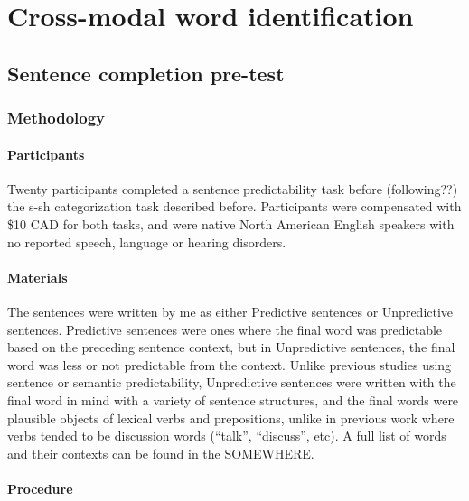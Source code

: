 
\chapter{Cross-modal word identification}

\section{Sentence completion pre-test}

\subsection{Methodology}

\subsubsection{Participants}

Twenty participants completed a sentence predictability task before (following??) the s-sh categorization task described before. Participants were compensated with \$10 CAD for both tasks, and were native North American English speakers with no reported speech, language or hearing disorders.

\subsubsection{Materials}

The sentences were written by me as either Predictive sentences or Unpredictive sentences.  Predictive sentences were ones where the final word was predictable based on the preceding sentence context, but in Unpredictive sentences, the final word was less or not predictable from the context.  Unlike previous studies using sentence or semantic predictability, Unpredictive sentences were written with the final word in mind with a variety of sentence structures, and the final words were plausible objects of lexical verbs and prepositions, unlike in previous work where verbs tended to be discussion words (``talk'', ``discuss'', etc).  A full list of words and their contexts can be found in the SOMEWHERE.

\subsubsection{Procedure}

